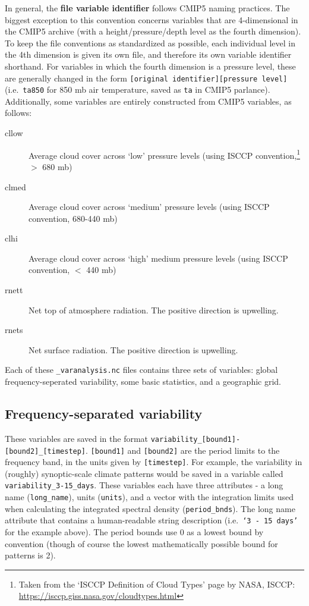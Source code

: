 \documentclass[11pt]{amsart}
\begin{document}
In general, the \textbf{file variable identifier} follows CMIP5 naming practices. The biggest exception to this convention concerns variables that are 4-dimensional in the CMIP5 archive (with a height/pressure/depth level as the fourth dimension). To keep the file conventions as standardized as possible, each individual level in the 4th dimension is given its own file, and therefore its own variable identifier shorthand. For variables in which the fourth dimension is a pressure level, these are generally changed in the form \texttt{[original identifier][pressure level]} (i.e.\ \texttt{ta850} for 850 mb air temperature, saved as \texttt{ta} in CMIP5 parlance).  Additionally, some variables are entirely constructed from CMIP5 variables, as follows: 
\begin{description}
\item [cllow] Average cloud cover across `low' pressure levels (using ISCCP convention,\footnote{Taken from the `ISCCP Definition of Cloud Types' page by NASA, ISCCP: \url{https://isccp.giss.nasa.gov/cloudtypes.html}} $>$ 680 mb)
\item [clmed] Average cloud cover across `medium' pressure levels (using ISCCP convention, 680-440 mb)
\item [clhi] Average cloud cover across `high' medium pressure levels (using ISCCP convention, $<$ 440 mb)
\item [rnett] Net top of atmosphere radiation. The positive direction is upwelling.
\item [rnets] Net surface radiation. The positive direction is upwelling.
\end{description}

Each of these \texttt{\_varanalysis.nc} files contains three sets of variables: global frequency-seperated variability, some basic statistics, and a geographic grid. 
\subsection{Frequency-separated variability}
These variables are saved in the format \texttt{variability\_[bound1]-[bound2]\_[timestep]}. \texttt{[bound1]} and \texttt{[bound2]} are the period limits to the frequency band, in the units given by \texttt{[timestep]}. For example, the variability in (roughly) synoptic-scale climate patterns would be saved in a variable called \texttt{variability\_3-15\_days}. These variables each have three attributes - a long name (\texttt{long\_name}), units (\texttt{units}), and a vector with the integration limits used when calculating the integrated spectral density (\texttt{period\_bnds}). The long name attribute that contains a human-readable string description (i.e.\ \texttt{`3 - 15 days'} for the example above). The period bounds use 0 as a lowest bound by convention (though of course the lowest mathematically possible bound for patterns is 2). 
\end{document}
